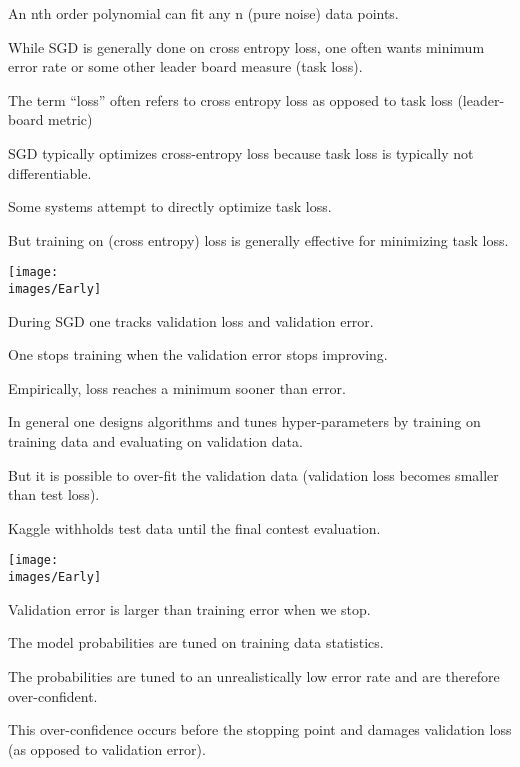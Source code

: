 {

An nth order polynomial can fit any n (pure noise) data points.


While SGD is generally done on cross entropy loss, one often wants minimum error rate or some other leader board measure (task loss).

\vfill
The term ``loss'' often refers to cross entropy loss as opposed to task loss (leader-board metric)

\vfill
SGD typically optimizes cross-entropy loss because task loss is typically not differentiable.

\vfill
Some systems attempt to directly optimize task loss.

\vfill
But training on (cross entropy) loss is generally effective for minimizing task loss.



\centerline{\texttt{[image: \\images/Early]}}

\vfill
During SGD one tracks validation loss and validation error.

\vfill
One stops training when the validation error stops improving.

\vfill
Empirically, loss reaches a minimum sooner than error.


In general one designs algorithms and tunes hyper-parameters by training on training data and evaluating on validation data.

\vfill
But it is possible to over-fit the validation data (validation loss becomes smaller than test loss).

\vfill
Kaggle withholds test data until the final contest evaluation.



\centerline{\texttt{[image: \\images/Early]}}

\vfill
Validation error is larger than training error when we stop.

\vfill
The model probabilities are tuned on training data statistics.

\vfill
The probabilities are tuned to an unrealistically low error rate and are therefore over-confident.

\vfill
This over-confidence occurs before the stopping point and damages validation loss (as opposed to validation error).

}
